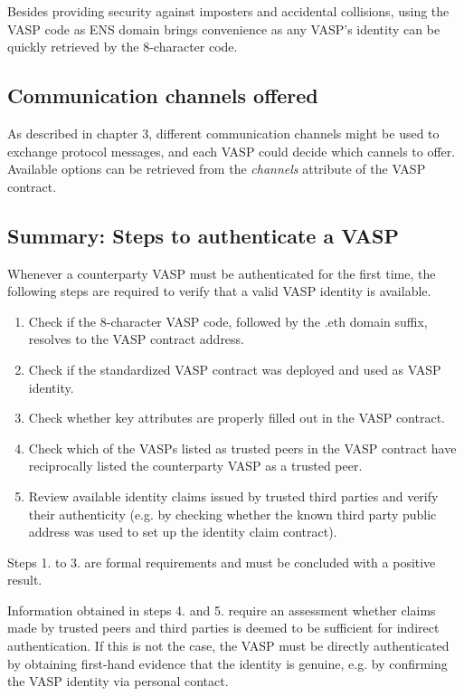 \documentclass{article}
\begin{document}
Besides providing security against imposters and accidental collisions, using the VASP code as ENS domain brings convenience as any VASP’s identity can be quickly retrieved by the 8-character code.

\subsection{Communication channels offered}

As described in chapter 3, different communication channels might be used to exchange protocol messages, and each VASP could decide which cannels to offer. Available options can be retrieved from the \textit{channels} attribute of the VASP contract.

\subsection{Summary: Steps to authenticate a VASP}

Whenever a counterparty VASP must be authenticated for the first time, the following steps are required to verify that a valid VASP identity is available.

\renewcommand{\theenumi}{\arabic{enumi}}
\begin{enumerate}
    \item Check if the 8-character VASP code, followed by the .eth domain suffix, resolves to the VASP contract address.
    \item Check if the standardized VASP contract was deployed and used as VASP identity.
    \item Check whether key attributes are properly filled out in the VASP contract.
    \item Check which of the VASPs listed as trusted peers in the VASP contract have reciprocally listed the counterparty VASP as a trusted peer.
    \item Review available identity claims issued by trusted third parties and verify their authenticity (e.g. by checking whether the known third party public address was used to set up the identity claim contract).
\end{enumerate}

Steps 1. to 3. are formal requirements and must be concluded with a positive result.

Information obtained in steps 4. and 5. require an assessment whether claims made by trusted peers and third parties is deemed to be sufficient for indirect authentication. If this is not the case, the VASP must be directly authenticated by obtaining first-hand evidence that the identity is genuine, e.g. by confirming the VASP identity via personal contact.
\end{document}
